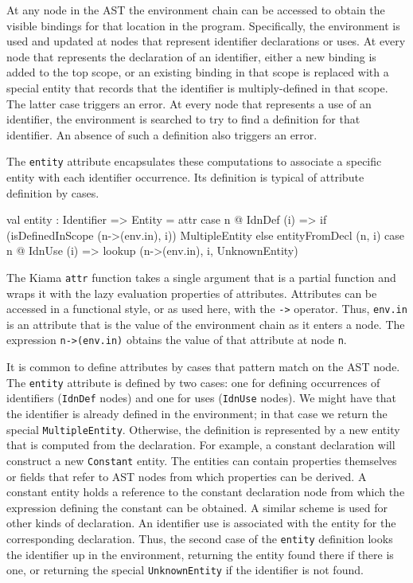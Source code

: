 At any node in the AST the environment chain can be accessed to obtain the visible bindings for that location in the program.
Specifically, the environment is used and updated at nodes that represent identifier declarations or uses.
At every node that represents the declaration of an identifier, either a new binding is added to the top scope, or an existing binding in that scope is replaced with a special entity that records that the identifier is multiply-defined in that scope.
The latter case triggers an error.
At every node that represents a use of an identifier, the environment is searched to try to find a definition for that identifier.
An absence of such a definition also triggers an error.

The \verb|entity| attribute encapsulates these computations to associate a specific entity with each identifier occurrence.
Its definition is typical of attribute definition by cases.

\begin{scala}
  val entity : Identifier => Entity =
    attr {
      case n @ IdnDef (i) =>
        if (isDefinedInScope (n->(env.in), i))
          MultipleEntity
        else
          entityFromDecl (n, i)
      case n @ IdnUse (i) =>
        lookup (n->(env.in), i, UnknownEntity)
    }
\end{scala}

\noindent
The Kiama \verb|attr| function takes a single argument that is a partial function and wraps it with the lazy evaluation properties of attributes.
Attributes can be accessed in a functional style, or as used here, with the \verb|->| operator.
Thus, \verb|env.in| is an attribute that is the value of the environment chain as it enters a node.
The expression \verb|n->(env.in)| obtains the value of that attribute at node \verb|n|.

It is common to define attributes by cases that pattern match on the AST node.
The \verb|entity| attribute is defined by two cases: one for defining occurrences of identifiers (\verb|IdnDef| nodes) and one for uses (\verb|IdnUse| nodes).
We might have that the identifier is already defined in the environment; in that case we return the special \verb|MultipleEntity|.
Otherwise, the definition is represented by a new entity that is computed from the declaration.
For example, a constant declaration will construct a new \verb|Constant| entity.
The entities can contain properties themselves or fields that refer to AST nodes from which properties can be derived.
A constant entity holds a reference to the constant declaration node from which the expression defining the constant can be obtained.
A similar scheme is used for other kinds of declaration.
An identifier use is associated with the entity for the corresponding declaration.
Thus, the second case of the \verb|entity| definition looks the identifier up in the environment, returning the entity found there if there is one, or returning the special \verb|UnknownEntity| if the identifier is not found.

